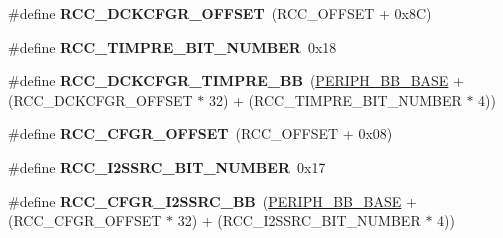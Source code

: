 \begin{DoxyCompactItemize}
\item 
\#define {\bfseries R\+C\+C\+\_\+\+D\+C\+K\+C\+F\+G\+R\+\_\+\+O\+F\+F\+S\+ET}~(R\+C\+C\+\_\+\+O\+F\+F\+S\+ET + 0x8\+C)\hypertarget{group___r_c_c_ex___bit_address___alias_region_gad444c5c356f3c3294fd6a2d73fafdaa7}{}\label{group___r_c_c_ex___bit_address___alias_region_gad444c5c356f3c3294fd6a2d73fafdaa7}

\item 
\#define {\bfseries R\+C\+C\+\_\+\+T\+I\+M\+P\+R\+E\+\_\+\+B\+I\+T\+\_\+\+N\+U\+M\+B\+ER}~0x18\hypertarget{group___r_c_c_ex___bit_address___alias_region_ga6af1cc5d0984efa0af27af520a29a1e7}{}\label{group___r_c_c_ex___bit_address___alias_region_ga6af1cc5d0984efa0af27af520a29a1e7}

\item 
\#define {\bfseries R\+C\+C\+\_\+\+D\+C\+K\+C\+F\+G\+R\+\_\+\+T\+I\+M\+P\+R\+E\+\_\+\+BB}~(\hyperlink{group___peripheral__memory__map_gaed7efc100877000845c236ccdc9e144a}{P\+E\+R\+I\+P\+H\+\_\+\+B\+B\+\_\+\+B\+A\+SE} + (R\+C\+C\+\_\+\+D\+C\+K\+C\+F\+G\+R\+\_\+\+O\+F\+F\+S\+ET $\ast$ 32) + (R\+C\+C\+\_\+\+T\+I\+M\+P\+R\+E\+\_\+\+B\+I\+T\+\_\+\+N\+U\+M\+B\+ER $\ast$ 4))\hypertarget{group___r_c_c_ex___bit_address___alias_region_ga170ba1aa6143f4b2b8824e371b9c29e7}{}\label{group___r_c_c_ex___bit_address___alias_region_ga170ba1aa6143f4b2b8824e371b9c29e7}

\item 
\#define {\bfseries R\+C\+C\+\_\+\+C\+F\+G\+R\+\_\+\+O\+F\+F\+S\+ET}~(R\+C\+C\+\_\+\+O\+F\+F\+S\+ET + 0x08)\hypertarget{group___r_c_c_ex___bit_address___alias_region_gafb1e90a88869585b970749de3c16ce4a}{}\label{group___r_c_c_ex___bit_address___alias_region_gafb1e90a88869585b970749de3c16ce4a}

\item 
\#define {\bfseries R\+C\+C\+\_\+\+I2\+S\+S\+R\+C\+\_\+\+B\+I\+T\+\_\+\+N\+U\+M\+B\+ER}~0x17\hypertarget{group___r_c_c_ex___bit_address___alias_region_gadf344d1efa4f3116800d74ab2fc0f0c5}{}\label{group___r_c_c_ex___bit_address___alias_region_gadf344d1efa4f3116800d74ab2fc0f0c5}

\item 
\#define {\bfseries R\+C\+C\+\_\+\+C\+F\+G\+R\+\_\+\+I2\+S\+S\+R\+C\+\_\+\+BB}~(\hyperlink{group___peripheral__memory__map_gaed7efc100877000845c236ccdc9e144a}{P\+E\+R\+I\+P\+H\+\_\+\+B\+B\+\_\+\+B\+A\+SE} + (R\+C\+C\+\_\+\+C\+F\+G\+R\+\_\+\+O\+F\+F\+S\+ET $\ast$ 32) + (R\+C\+C\+\_\+\+I2\+S\+S\+R\+C\+\_\+\+B\+I\+T\+\_\+\+N\+U\+M\+B\+ER $\ast$ 4))\hypertarget{group___r_c_c_ex___bit_address___alias_region_ga2773df79f99911154b083d82e49ceff9}{}\label{group___r_c_c_ex___bit_address___alias_region_ga2773df79f99911154b083d82e49ceff9}


\end{DoxyCompactItemize}
